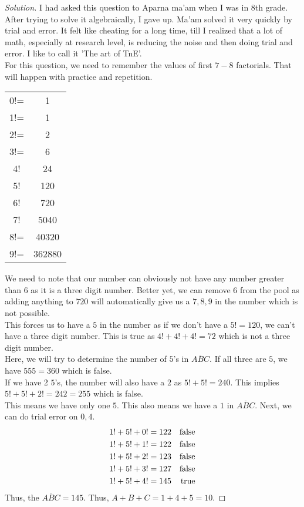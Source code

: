 \begin{proof}
    [Solution]
    I had asked this question to Aparna ma'am when I was in 8th grade. After trying to solve it algebraically, I gave up. Ma'am solved it very quickly by trial and error. It felt like cheating for a long time, till I realized that a lot of math, especially at research level, is reducing the noise and then doing trial and error. I like to call it 'The art of TnE'.\\
    For this question, we need to remember the values of first $7-8$ factorials. That will happen with practice and repetition.
    \begin{table}
        \centering
        \begin{tabular}{cc}
            0!= & 1\\
            1!=& 1 \\
            2!=& 2\\
             3!=& 6\\
             4! & 24\\
             5! & 120\\
             6! & 720\\
             7! & 5040\\
             8!= & 40320\\
             9!= & 362880\\
    \end{tabular}
    \end{table}
    We need to note that our number can obviously not have any number greater than $6$ as it is a three digit number. Better yet, we can remove $6$ from the pool as adding anything to $720$ will automatically give us a $7,8,9$ in the number which is not possible.\\
    This forces us to have a $5$ in the number as if we don't have a $5!=120$, we can't have a three digit number. This is true as $4!+4!+4!=72$ which is not a three digit number.\\
    Here, we will try to determine the number of $5$'s in $\overline{ABC}$. If all three are $5$, we have $555=360$ which is false.\\
    If we have 2 $5$'s, the number will also have a $2$ as $5!+5!=240$. This implies $5!+5!+2!=242=255$ which is false.\\
    This means we have only one $5$. This also means we have a $1$ in $\overline{ABC}$. Next, we can do trial error on $0,4$.\\
    \begin{align*}
        1!+5!+0! & = 122 & \operatorname*{false}\\
        1!+5!+1! & = 122 & \operatorname*{false}\\
        1!+5!+2! & = 123 & \operatorname*{false}\\
        1!+5!+3! & = 127 & \operatorname*{false}\\
        1!+5!+4! & = 145 & \operatorname*{true}\\
    \end{align*}
    Thus, the $\overline{ABC}=145$. Thus, $A+B+C=1+4+5=10$.
\end{proof}

